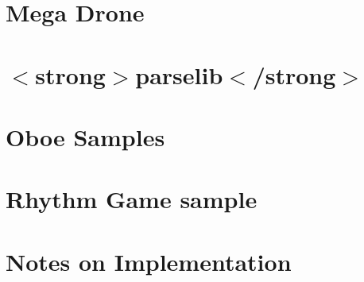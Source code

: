 \let\mypdfximage\pdfximage\def\pdfximage{\immediate\mypdfximage}\documentclass[twoside]{book}
\newcommand{\+}{\discretionary{\mbox{\scriptsize$\hookleftarrow$}}{}{}}
\begin{document}
\chapter{Mega Drone}
\label{md__c_1__users_fab_src__github_branches__neural_amp_modeler_plugin_i_plug2__dependencies__build_e5ce1aff4027622d8205fd02206e71fd}

\chapter{$<$strong$>$parselib$<$/strong$>$}
\label{md__c_1__users_fab_src__github_branches__neural_amp_modeler_plugin_i_plug2__dependencies__build_28a1f5223ca70ab5bd7f8acf24fa5019}

\chapter{Oboe Samples}
\label{md__c_1__users_fab_src__github_branches__neural_amp_modeler_plugin_i_plug2__dependencies__build_a27d9336b2163dce447b681256db0937}

\chapter{Rhythm Game sample}
\label{md__c_1__users_fab_src__github_branches__neural_amp_modeler_plugin_i_plug2__dependencies__build_874158d6837623bc8c4b4c1de6ac7afd}

\chapter{Notes on Implementation}
\label{md__c_1__users_fab_src__github_branches__neural_amp_modeler_plugin_i_plug2__dependencies__build_d3b4229b6f0df3bb6e75481b50847057}

\end{document}
